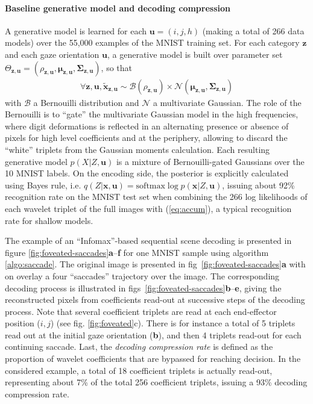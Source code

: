 \documentclass[12pt,twoside,openright]{article}
\begin{document}
\paragraph{Baseline generative model and decoding compression}
A generative model is learned for each $\boldsymbol{u} = (i,j,h)$ (making a total of 266 data models) over the 55,000 examples of the MNIST training set. For each category $\boldsymbol{z}$ and each gaze orientation $\boldsymbol{u}$, a generative model is built over parameter set $\Theta_{\boldsymbol{z},\boldsymbol{u}} = (\rho_{\boldsymbol{z},\boldsymbol{u}}, \boldsymbol{\mu}_{\boldsymbol{z},\boldsymbol{u}}, \boldsymbol{\Sigma}_{\boldsymbol{z},\boldsymbol{u}})$, so that 
\begin{align}
\forall \boldsymbol{z},\boldsymbol{u}, \tilde{\boldsymbol{x}}_{\boldsymbol{z},\boldsymbol{u}} \sim \mathcal{B}(\rho_{\boldsymbol{z},\boldsymbol{u}}) \times \mathcal{N}(\boldsymbol{\mu}_{\boldsymbol{z},\boldsymbol{u}}, \boldsymbol{\Sigma}_{\boldsymbol{z},\boldsymbol{u}})\label{eq:bernouilli-gated}
\end{align} 
with $\mathcal{B}$ a Bernouilli distribution and $\mathcal{N}$ a multivariate Gaussian. The role of the Bernouilli is to ``gate'' the multivariate Gaussian model in the high frequencies, where digit deformations is reflected in an alternating presence or absence of pixels for high level coefficients and at the periphery, allowing to discard the ``white'' triplets from the Gaussian moments calculation. Each resulting generative model $p(X|Z,\boldsymbol{u})$ is a mixture of Bernouilli-gated Gaussians over the 10 MNIST labels. On the encoding side, the posterior is explicitly calculated using Bayes rule, i.e. $q(Z|\boldsymbol{x},\boldsymbol{u}) = \text{softmax} \log p(\boldsymbol{x}|Z,\boldsymbol{u})$, issuing about 92\% recognition rate on the MNIST test set when combining the 266 log likelihoods of each wavelet triplet of the full images with (\ref{eq:accum}), a typical recognition rate for shallow models.

The example of an ``Infomax''-based sequential scene decoding is presented in figure \ref{fig:foveated-saccades}\textbf{a}--\textbf{f} for one MNIST sample using algorithm \ref{algo:saccade}.
The original image is presented in fig~\ref{fig:foveated-saccades}\textbf{a} with on overlay a four ``saccades'' trajectory over the image. The corresponding decoding process is illustrated in figs~\ref{fig:foveated-saccades}\textbf{b}--\textbf{e}, giving the reconstructed pixels from  coefficients read-out at successive steps of the decoding process.
Note that several coefficient triplets are read at each end-effector position ($i,j$) (see fig. \ref{fig:foveated}c). There is for instance a total of 5 triplets read out at the initial gaze orientation (\textbf{b}), and then 4 triplets read-out for each continuing saccade. 
Last, the \emph{decoding compression rate} is defined as the proportion of wavelet coefficients that are bypassed for reaching decision. In the considered example, a total of 18 coefficient triplets is  actually read-out, representing about 7\% of the total 256 coefficient triplets, issuing a 93\% decoding compression rate. 
\end{document}
